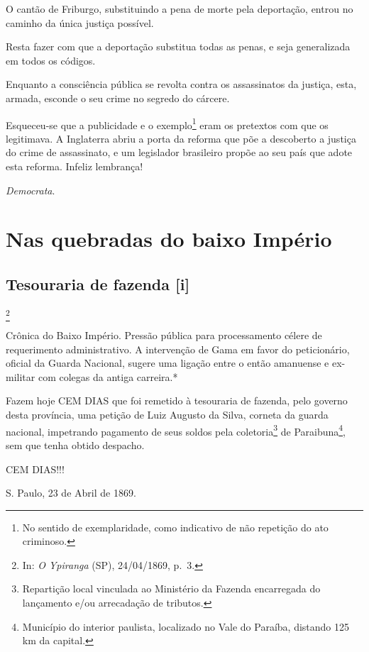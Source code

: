 O cantão de Friburgo, substituindo a pena de morte pela deportação,
entrou no caminho da única justiça possível.

Resta fazer com que a deportação substitua todas as penas, e seja
generalizada em todos os códigos.

Enquanto a consciência pública se revolta contra os assassinatos da
justiça, esta, armada, esconde o seu crime no segredo do cárcere.

Esqueceu-se que a publicidade e o exemplo\footnote{No sentido de
  exemplaridade, como indicativo de não repetição do ato criminoso.}
eram os pretextos com que os legitimava. A Inglaterra abriu a porta da
reforma que põe a descoberto a justiça do crime de assassinato, e um
legislador brasileiro propõe ao seu país que adote esta reforma. Infeliz
lembrança!

\emph{Democrata}.

\part{Nas quebradas do baixo Império}

\chapter{Tesouraria de fazenda {[}i{]}}\footnote{In: \emph{O Ypiranga} (SP),
  24/04/1869, p.~3.}

\begin{didascalia}
Crônica do Baixo Império. Pressão pública para processamento célere de
requerimento administrativo. A intervenção de Gama em favor do
peticionário, oficial da Guarda Nacional, sugere uma ligação entre o
então amanuense e ex-militar com colegas da antiga carreira.*
\end{didascalia}

\asterisc{}

Fazem hoje CEM DIAS que foi remetido à tesouraria de fazenda, pelo
governo desta província, uma petição de Luiz Augusto da Silva, corneta
da guarda nacional, impetrando pagamento de seus soldos pela
coletoria\footnote{Repartição local vinculada ao Ministério da Fazenda
  encarregada do lançamento e/ou arrecadação de tributos.} de
Paraibuna\footnote{Município do interior paulista, localizado no Vale
  do Paraíba, distando 125 km da capital.}, sem que tenha obtido
despacho.

CEM DIAS!!!

S. Paulo, 23 de Abril de 1869.

